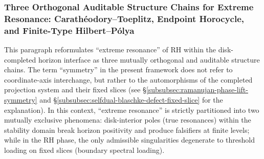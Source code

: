 \subsubsection{Three Orthogonal Auditable Structure Chains for Extreme Resonance: Carath\'eodory--Toeplitz, Endpoint Horocycle, and Finite-Type Hilbert--P{\'o}lya}\label{subsubsec:xi-extreme-resonance-orthogonal-audit-chains}
This paragraph reformulates ``extreme resonance'' of RH within the disk-completed horizon interface as three mutually orthogonal and auditable structure chains.
The term ``symmetry'' in the present framework does not refer to coordinate-axis interchange, but rather to the automorphisms of the completed projection system and their fixed slices (see \S\ref{subsubsec:ramanujan-phase-lift-symmetry} and \S\ref{subsubsec:selfdual-blaschke-defect-fixed-slice} for the explanation).
In this context, ``extreme resonance'' is strictly partitioned into two mutually exclusive phenomena:
disk-interior poles (true resonances) within the stability domain break horizon positivity and produce falsifiers at finite levels;
while in the RH phase, the only admissible singularities degenerate to threshold loading on fixed slices (boundary spectral loading).

